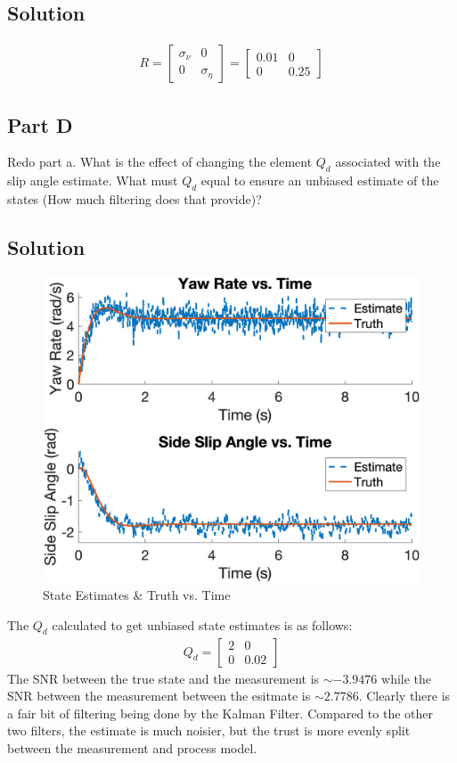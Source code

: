 \documentclass{article}
\begin{document}
\subsection*{Solution}
\begin{gather*}
    R = \begin{bmatrix}
        \sigma_\nu & 0\\
        0 & \sigma_\eta
    \end{bmatrix} = \begin{bmatrix}
        0.01 & 0\\
        0 & 0.25
    \end{bmatrix}
\end{gather*}

\subsection*{Part D}
Redo part a.  What is the effect of changing the element $Q_d$ associated with the slip angle estimate.  What must $Q_d$ equal to ensure an unbiased estimate of the states (How much filtering does that provide)?
\subsection*{Solution}
\begin{figure}[H]
    \centering
    \includegraphics[width=0.75\linewidth]{../figures/p4d_kf.png}
    \caption{State Estimates \& Truth vs. Time}\label{fig:p4d_kf}
\end{figure}
The $Q_d$ calculated to get unbiased state estimates is as follows:
\begin{gather*}
    Q_d = \begin{bmatrix}
        2 & 0\\
        0 & 0.02
    \end{bmatrix}
\end{gather*}
The SNR between the true state and the measurement is $\sim -3.9476$ while the SNR between the measurement between the esitmate is $\sim 2.7786$.  Clearly there is a fair bit of filtering being done by the Kalman Filter.  Compared to the other two filters, the estimate is much noisier, but the trust is more evenly split between the measurement and process model.
\end{document}

